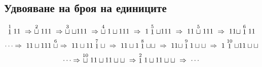 \subsection*{Удвояване на броя на единиците}


\[\stackrel{1}{1}11\ \Rightarrow\ \stackrel{2}{\blank} 111\ \Rightarrow\ \stackrel{3}{\blank}\blank 111\ \Rightarrow\ \stackrel{4}{\blank}1\blank 111\ \Rightarrow\ 1\stackrel{5}{1}\blank 111\ \Rightarrow\  11\stackrel{5}{\blank}111\ \Rightarrow\  11 \blank \stackrel{6}{1}11\]
\[\dots \Rightarrow\ 11\blank 111\stackrel{6}{\blank}\ \Rightarrow\ 11\blank 11\stackrel{7}{1}\blank\ \Rightarrow\ 11\blank 1\stackrel{8}{1}\blank\blank\ \Rightarrow\ 11\blank \stackrel{9}{1}1\blank\blank\ \Rightarrow\  1\stackrel{10}{1}\blank 11\blank\blank\]
\[\dots \Rightarrow\ \stackrel{10}{\blank}11\blank 11\blank\blank\ \Rightarrow\ \stackrel{2}{1}1\blank 11\blank\blank\ \Rightarrow\ \cdots\]

